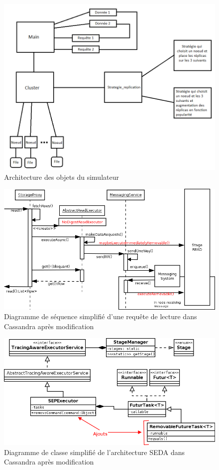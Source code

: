 \documentclass[12pt]{article}
\begin{document}

\begin{figure}[H]
	\centering
        \includegraphics[width=12cm]{images/implementation/archiSimulateur.png}
    \caption{Architecture des objets du simulateur \label{fig:archisimulateur}}
\end{figure}

\begin{figure}[H]
	\centering
        \includegraphics[width=12cm]{images/implementation/read_diagram_modified.png}
    \caption{Diagramme de séquence simplifié d'une requête de lecture dans Cassandra après modification \label{fig:read_diagram_modified}}
\end{figure}

\begin{figure}[p]
	\centering
		\includegraphics[width=15cm]{images/implementation/stages_diagram_modified.png}
	\caption{Diagramme de classe simplifié de l'architecture SEDA dans Cassandra après modification \label{fig:stages_diagram_modified}}
\end{figure}
\end{document}
